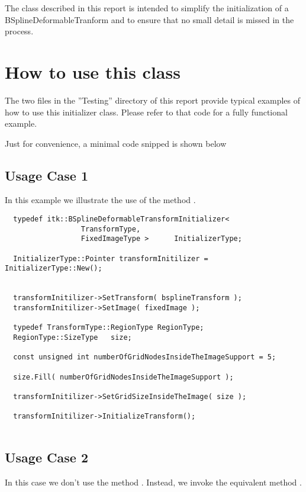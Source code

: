 \documentclass{InsightArticle}
\begin{document}
The class described in this report is intended to simplify the initialization
of a BSplineDeformableTranform and to ensure that no small detail is missed in
the process.


\section{How to use this class}

The two files in the ''Testing'' directory of this report provide typical
examples of how to use this initializer class. Please refer to that code for a
fully functional example.

Just for convenience, a minimal code snipped is shown below 

\subsection{Usage Case 1}
\label{sec:Case1}

In this example we illustrate the use of the method .

\small
\begin{verbatim}
  typedef itk::BSplineDeformableTransformInitializer<
                  TransformType, 
                  FixedImageType >      InitializerType;

  InitializerType::Pointer transformInitilizer = InitializerType::New();


  transformInitilizer->SetTransform( bsplineTransform );
  transformInitilizer->SetImage( fixedImage );

  typedef TransformType::RegionType RegionType;
  RegionType::SizeType   size;

  const unsigned int numberOfGridNodesInsideTheImageSupport = 5;

  size.Fill( numberOfGridNodesInsideTheImageSupport );

  transformInitilizer->SetGridSizeInsideTheImage( size );

  transformInitilizer->InitializeTransform();
 
\end{verbatim}
\normalsize


\subsection{Usage Case 2}
\label{sec:Case2}

In this case we don't use the method . Instead,
we invoke the equivalent method .
\end{document}
